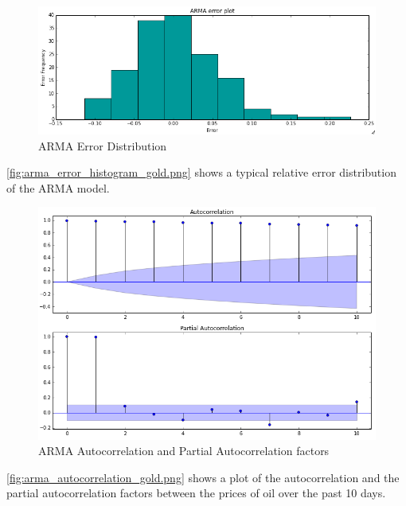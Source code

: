 \documentclass[runningheads]{llncs}
\begin{document}
\begin{center}
\begin{figure}
\centering
\includegraphics[width=\textwidth]{arma_error_histogram_gold.png}
\caption{ARMA Error Distribution}
\label{fig:arma_error_histogram_gold.png}
\end{figure}
\end{center}


\noindent \autoref{fig:arma_error_histogram_gold.png} shows a typical relative error distribution of the ARMA model.

\begin{center}
\begin{figure}
\centering
\includegraphics[width=\textwidth]{arma_autocorrelation_gold.png}
\caption{ARMA Autocorrelation and Partial Autocorrelation factors}
\label{fig:arma_autocorrelation_gold.png}
\end{figure}
\end{center}

\noindent \autoref{fig:arma_autocorrelation_gold.png} shows a plot of the autocorrelation and the partial autocorrelation factors between the prices of oil over the past 10 days. \\
\end{document}
